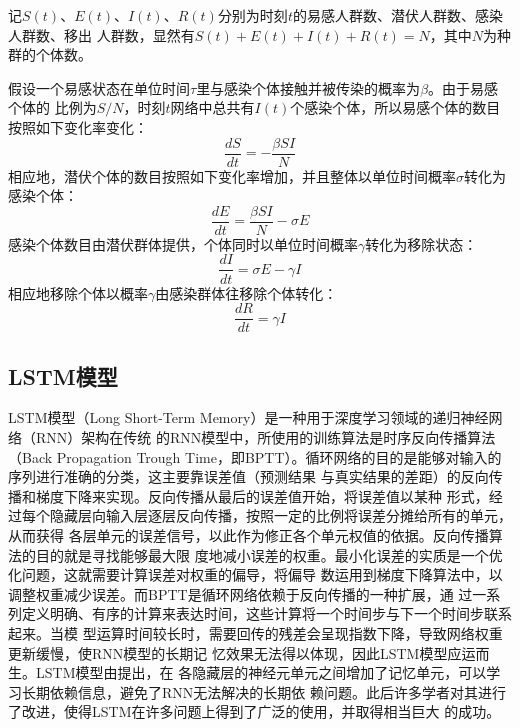 \documentclass[lang=cn,11pt,a4paper,cite=authoryear]{elegantpaper}
\begin{document}
记$S(t)$、$E(t)$、$I(t)$、$R(t)$分别为时刻$t$的易感人群数、潜伏人群数、感染人群数、移出
人群数，显然有$S(t)+E(t)+I(t)+R(t)=N$，其中$N$为种群的个体数。

假设一个易感状态在单位时间$\tau$里与感染个体接触并被传染的概率为$\beta$。由于易感个体的
比例为$S/N$，时刻$t$网络中总共有$I(t)$个感染个体，所以易感个体的数目按照如下变化率变化：
\begin{equation}
\frac{dS}{dt}=-\frac{\beta SI}{N}
\end{equation}
相应地，潜伏个体的数目按照如下变化率增加，并且整体以单位时间概率$\sigma$转化为感染个体：
\begin{equation}
\frac{dE}{dt}=\frac{\beta SI}{N}-\sigma E
\end{equation}
感染个体数目由潜伏群体提供，个体同时以单位时间概率$\gamma$转化为移除状态：
\begin{equation}
\frac{dI}{dt}=\sigma E-\gamma I
\end{equation}
相应地移除个体以概率$\gamma$由感染群体往移除个体转化：
\begin{equation}
\frac{dR}{dt}=\gamma I
\end{equation}
\subsection{LSTM模型}
LSTM模型（Long Short-Term Memory）是一种用于深度学习领域的递归神经网络（RNN）架构在传统
的RNN模型中，所使用的训练算法是时序反向传播算法（Back Propagation Trough 
Time，即BPTT）。循环网络的目的是能够对输入的序列进行准确的分类，这主要靠误差值（预测结果
与真实结果的差距）的反向传播和梯度下降来实现。反向传播从最后的误差值开始，将误差值以某种
形式，经过每个隐藏层向输入层逐层反向传播，按照一定的比例将误差分摊给所有的单元，从而获得
各层单元的误差信号，以此作为修正各个单元权值的依据。反向传播算法的目的就是寻找能够最大限
度地减小误差的权重。最小化误差的实质是一个优化问题，这就需要计算误差对权重的偏导，将偏导
数运用到梯度下降算法中，以调整权重减少误差。而BPTT是循环网络依赖于反向传播的一种扩展，通
过一系列定义明确、有序的计算来表达时间，这些计算将一个时间步与下一个时间步联系起来。当模
型运算时间较长时，需要回传的残差会呈现指数下降，导致网络权重更新缓慢，使RNN模型的长期记
忆效果无法得以体现，因此LSTM模型应运而生。LSTM模型由\cite{hochreiter1997lstm}提出，在
各隐藏层的神经元单元之间增加了记忆单元，可以学习长期依赖信息，避免了RNN无法解决的长期依
赖问题。此后许多学者对其进行了改进，使得LSTM在许多问题上得到了广泛的使用，并取得相当巨大
的成功\citep{gers2000learning, graves2005bidirectional, graves2005framewise, 
schmidhuber2007training, bayer2009evolving, schaul2010pybrain, 
graves2013hybrid, bayer2014Learning}。
\end{document}
